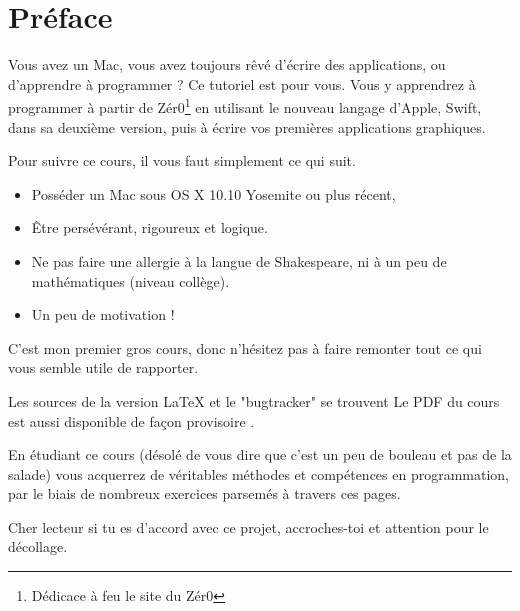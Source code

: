 \chapter*{Préface}
{}
Vous avez un Mac, vous avez toujours rêvé d'écrire des applications, ou d'apprendre à programmer ?
Ce tutoriel est pour vous.
Vous y apprendrez à programmer à partir de  Zér0\footnote{Dédicace à feu le site du Zér0} 
en utilisant le nouveau langage d'Apple, Swift, dans sa deuxième version, puis à écrire vos premières applications graphiques.

Pour suivre ce cours, il vous faut simplement ce qui suit.
\begin{itemize}
\item Posséder un Mac sous OS X 10.10 Yosemite ou plus récent,
\item Être persévérant, rigoureux et logique.
\item Ne pas faire une allergie à la langue de Shakespeare, ni à un peu de mathématiques (niveau collège).
\item Un peu de motivation !
\end{itemize}



C'est mon premier gros cours, donc n'hésitez pas à faire remonter tout ce qui vous semble utile de rapporter.

Les sources de la version LaTeX et le "bugtracker" se trouvent 
Le PDF du cours est aussi disponible de façon provisoire .

En étudiant ce cours
(désolé de vous dire que c'est un peu de bouleau et pas de la salade)
vous acquerrez de véritables méthodes et compétences en programmation,
par le biais de nombreux exercices parsemés à travers ces pages.

Cher lecteur si tu es d'accord avec ce projet, accroches-toi et attention pour le décollage.
